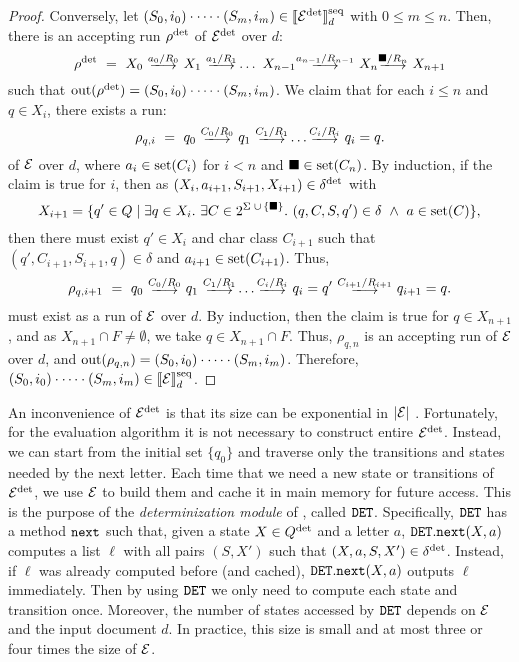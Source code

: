 \begin{proof}
	Conversely, let $(S_0, i_0)\cdot \cdots \cdot(S_m, i_m) \in
		\llbracket\mathcal{E}^{{\operatorname{det}}}\rrbracket^{\operatorname{seq}}_d$ with $0 \leq m \leq n$. Then, there is an
		accepting run $\rho^{{\operatorname{det}}}$ of $\mathcal{E}^{{\operatorname{det}}}$ over $d$:
	$$
		\rho^{\odet} \ = \ X_0 \ \longtrans{a_0 / R_0} \ X_1 \ \longtrans{a_1 / R_1}  \ldots \ X_{n-1} \longtrans{a_{n-1} / R_{n-1}} \ X_{n} \longtrans{\osymbol / R_n} \ X_{n+1}
	$$
	such that $\operatorname{out}(\rho^{{\operatorname{det}}}) = (S_0, i_0)\cdot \cdots \cdot(S_m, i_m)$. We
	claim that for each $i \leq n$ and $q \in X_i$, there exists a run:
	$$
		\rho_{q,i} \ = \ q_0 \ \longtrans{C_0 / R_0} \ q_1 \ \longtrans{C_1 / R_1}  \ldots \longtrans{C_{i} / R_{i}} \ q_{i} = q.
	$$
	of $\mathcal{E}$ over $d$, where $a_i \in \operatorname{set}(C_i)$ for $i < n$ and $\blacksquare \in
	\operatorname{set}(C_n)$. By induction, if the claim is true for $i$, then as $(X_i,
	a_{i+1}, S_{i+1}, X_{i+1}) \in \delta^{{\operatorname{det}}}$ with $$X_{i+1} = \{q' \in Q
	\mid \exists q \in X_i.\ \exists C \in 2^{\Sigma \; \cup \, \{\blacksquare\}}.\
	(q, C, S, q') \in \delta\ \wedge\ a \in \operatorname{set}(C)\},$$ then there must exist
	$q' \in X_{i}$ and char class $C_{i+1}$ such that $(q', C_{i+1}, S_{i+1}, q)
	\in \delta$ and $a_{i+1} \in \operatorname{set}(C_{i+1})$. Thus, 
	$$
		\rho_{q,i+1} \ = \ q_0 \ \longtrans{C_0 / R_0} \ q_1 \ \longtrans{C_1 / R_1}  \ldots \longtrans{C_{i} / R_{i}} \ q_{i} = q' \ \longtrans{C_{i+1} / R_{i+1}} \ q_{i+1} = q.
	$$
	must exist as a run of $\mathcal{E}$ over $d$. By induction, then the claim is true
	for $q \in X_{n+1}$, and as $X_{n+1} \cap F \neq \emptyset$, we take $q \in
	X_{n+1} \cap F$. Thus, $\rho_{q, n}$ is an accepting run of $\mathcal{E}$ over $d$,
	and $\operatorname{out}(\rho_{q, n}) = (S_0, i_0)\cdot \cdots \cdot(S_m, i_m)$.
	Therefore, $(S_0, i_0)\cdot \cdots \cdot(S_m, i_m) \in \llbracket\mathcal{E}\rrbracket^{\operatorname{seq}}_d$.
\end{proof}


An inconvenience of $\mathcal{E}^{{\operatorname{det}}}$ is that its size can be exponential in $|\mathcal{E}|$
\citep{HopcroftU79}. Fortunately, for the evaluation algorithm it is not
necessary to construct %
entire $\mathcal{E}^{{\operatorname{det}}}$. Instead, we can start from the initial set $\{q_0\}$ and
traverse only the transitions and states needed by the next letter. Each time
that we need a new state or transitions of $\mathcal{E}^{{\operatorname{det}}}$, we use $\mathcal{E}$ to build
them and cache it in main memory for future access. This is the purpose of the
\emph{determinization module} of \rematch, called $\mathtt{DET}$. Specifically, $\mathtt{DET}$
has a method $\texttt{next}$ such that, given a state $X \in Q^{\operatorname{det}}$ and a letter
$a$, $\mathtt{DET}.\texttt{next}(X, a)$ computes a list $\ell$ with all pairs $(S, X')$
such that $(X,a,S,X') \in \delta^{\operatorname{det}}$. Instead, if $\ell$ was already computed
before (and cached), $\mathtt{DET}.\texttt{next}(X, a)$ outputs $\ell$ immediately. Then by
using $\mathtt{DET}$ we only need to compute each state and transition once. Moreover,
the number of states accessed by $\mathtt{DET}$ depends on $\mathcal{E}$ and the input document
$d$. In practice, this size is small and at most three or four times the size of
$\mathcal{E}$.

